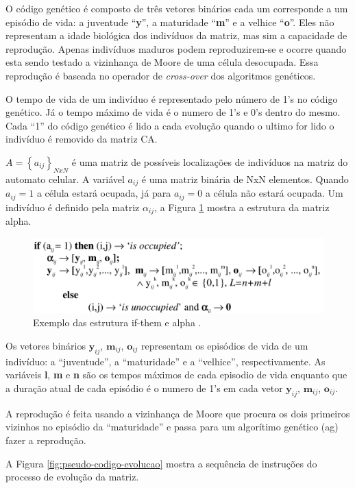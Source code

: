 \documentclass[12pt]{article}
\begin{document}
O código genético é composto de três vetores binários cada um corresponde a um
episódio de vida: a juventude ``\textbf{y}'', a maturidade ``\textbf{m}'' e a
velhice ``\textbf{o}''. Eles não representam a idade biológica dos indivíduos
da matriz, mas sim a capacidade de reprodução. Apenas indivíduos maduros podem
reproduzirem-se e ocorre quando esta sendo testado a vizinhança de Moore de
uma célula desocupada. Essa reprodução é baseada no operador de
\textit{cross-over} dos algoritmos genéticos.

O tempo de vida de um indivíduo é representado pelo número de 1's no código
genético. Já o tempo máximo de vida é o numero de 1's e 0's dentro do mesmo.
Cada ``1'' do código genético é lido a cada evolução quando o ultimo for lido
o indivíduo é removido da matriz CA.

$A = \left \{a_{ij}\right \}_{NxN}$ é uma matriz de possíveis localizações de
indivíduos na matriz do automato celular. A variável $a_{ij}$ é uma matriz
binária de NxN elementos. Quando $a_{ij} = 1$ a célula estará ocupada, já para
$a_{ij} = 0$ a célula não estará ocupada. Um indivíduo é definido pela matriz
$\alpha _{ij}$, a Figura \ref{fig:estrutura-alpha} mostra a estrutura da
matriz alpha.

\begin{figure}[h!]
\centering
\includegraphics[width=.5\textwidth]{imagens/estrutura-alpha}
\caption{Exemplo das estrutura if-them e alpha \cite{dzwinel:04}.}
\label{fig:estrutura-alpha}
\end{figure}

Os vetores binários $\textbf{y}_{ij}$, $\textbf{m}_{ij}$, $\textbf{o}_{ij}$
representam os episódios de vida de um indivíduo: a ``juventude'', a 
``maturidade'' e a ``velhice'', respectivamente. As variáveis \textbf{l},
\textbf{m} e \textbf{n} são os tempos máximos de cada episodio de vida
enquanto que a duração atual de cada episódio é o numero de 1's em cada vetor
$\textbf{y}_{ij}$, $\textbf{m}_{ij}$, $\textbf{o}_{ij}$.

A reprodução é feita usando a vizinhança de Moore que procura os dois
primeiros vizinhos no episódio da ``maturidade'' e passa para um algorítimo
genético (ag) fazer a reprodução.

A Figura \ref{fig:pseudo-codigo-evolucao} mostra a sequência de instruções
do processo de evolução da matriz. 
\end{document}
